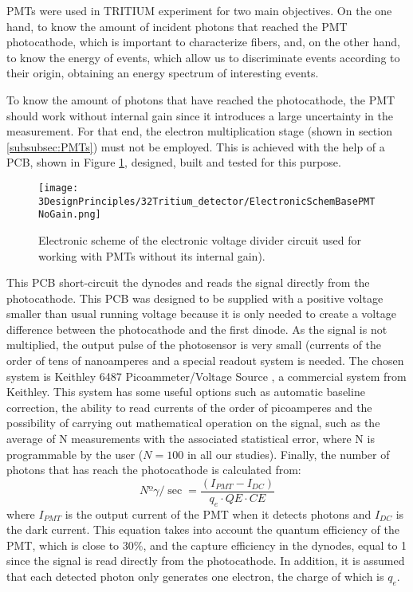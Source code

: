 PMTs were used in TRITIUM experiment for two main objectives. On the one hand, to know the amount of incident photons that reached the PMT photocathode, which is important to characterize fibers, and, on the other hand, to know the energy of events, which allow us to discriminate events according to their origin, obtaining an energy spectrum of interesting events. 

To know the amount of photons that have reached the photocathode, the PMT should work without internal gain since it introduces a large uncertainty in the measurement. For that end, the electron multiplication stage (shown in section \ref{subsubsec:PMTs}) must not be employed. This is achieved with the help of a PCB, shown in Figure \ref{fig:ElectronicSchemeBasePMTNoGain}, designed, built and tested for this purpose.  

\begin{figure}[htbp]
\centering
\texttt{[image: 3DesignPrinciples/32Tritium\_detector/ElectronicSchemBasePMTNoGain.png]}
\caption{Electronic scheme of the electronic voltage divider circuit used for working with PMTs without its internal gain).\label{fig:ElectronicSchemeBasePMTNoGain}}
\end{figure}

This PCB short-circuit the dynodes and reads the signal directly from the photocathode. This PCB was designed to be supplied with a positive voltage smaller than usual running voltage because it is only needed to create a voltage difference between the photocathode and the first dinode. As the signal is not multiplied, the output pulse of the photosensor is very small (currents of the order of tens of nanoamperes and a special readout system is needed. The chosen system is Keithley 6487 Picoammeter/Voltage Source \cite{DataSheetKeithley6487}, a commercial system from Keithley. This system has some useful options such as automatic baseline correction, the ability to read currents of the order of picoamperes and the possibility of carrying out mathematical operation on the signal, such as the average of N measurements with the associated statistical error, where N is programmable by the user ($N=100$ in all our studies). Finally, the number of photons that has reach the photocathode is calculated from:
\begin{equation}
Nº\gamma/\sec = \frac{\left( I_{PMT} - I_{DC} \right)}{q_e \cdot{} QE \cdot{} CE}
\label{eq:NumPhotonsFromIntensityPMT}
\end{equation}
where $I_{PMT}$ is the output current of the PMT when it detects photons and $I_{DC}$ is the dark current. This equation takes into account the quantum efficiency of the PMT, which is close to $30\%$, and the capture efficiency in the dynodes, equal to 1 since the signal is read directly from the photocathode. In addition, it is assumed that each detected photon only generates one electron, the charge of which is $q_e$.

